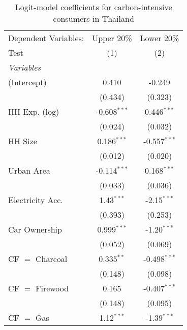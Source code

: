 
\begin{table}[htbp!]
   \centering
   \small
   \begin{adjustbox}{width = 1\textwidth, max height = 0.95\textheight, center}
      \begin{threeparttable}[b]
         \caption{\label{tab:Logit_1_THA} Logit-model coefficients for carbon-intensive consumers in Thailand}
         \begin{tabular}{lcc}
            \tabularnewline \midrule \midrule
            Dependent Variables: & Upper 20\%     & Lower 20\%\\   
            Test                 & (1)            & (2)\\  
            \midrule
            \emph{Variables}\\
            (Intercept)          & 0.410          & -0.249\\   
                                 & (0.434)        & (0.323)\\   
            HH Exp. (log)        & -0.608$^{***}$ & 0.446$^{***}$\\   
                                 & (0.024)        & (0.032)\\   
            HH Size              & 0.186$^{***}$  & -0.557$^{***}$\\   
                                 & (0.012)        & (0.020)\\   
            Urban Area           & -0.114$^{***}$ & 0.168$^{***}$\\   
                                 & (0.033)        & (0.036)\\   
            Electricity Acc.     & 1.43$^{***}$   & -2.15$^{***}$\\   
                                 & (0.393)        & (0.253)\\   
            Car Ownership        & 0.999$^{***}$  & -1.20$^{***}$\\   
                                 & (0.052)        & (0.069)\\   
            CF $=$ Charcoal      & 0.335$^{**}$   & -0.498$^{***}$\\   
                                 & (0.148)        & (0.098)\\   
            CF $=$ Firewood      & 0.165          & -0.407$^{***}$\\   
                                 & (0.148)        & (0.095)\\   
            CF $=$ Gas           & 1.12$^{***}$   & -1.39$^{***}$\\   

\end{tabular}
\end{threeparttable}
\end{adjustbox}
\end{table}
